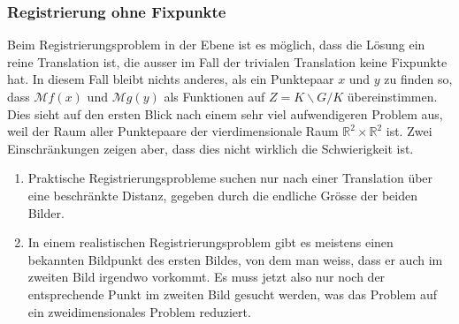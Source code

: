 %
%
\subsubsection{Registrierung ohne Fixpunkte}
Beim Registrierungsproblem in der Ebene ist es möglich, dass die
Lösung ein reine Translation ist, die ausser im Fall der trivialen
Translation keine Fixpunkte hat.
In diesem Fall bleibt nichts anderes, als ein Punktepaar $x$ und $y$
zu finden so, dass $\mathcal{M}f(x)$ und $\mathcal{M}g(y)$ als Funktionen
auf $Z=K\backslash G/K$ übereinstimmen.
Dies sieht auf den ersten Blick nach einem sehr viel aufwendigeren
Problem aus, weil der Raum aller Punktepaare der vierdimensionale
Raum $\mathbb{R}^2\times\mathbb{R}^2$ ist.
Zwei Einschränkungen zeigen aber, dass dies nicht wirklich die
Schwierigkeit ist.
\begin{enumerate}
\item
Praktische Registrierungsprobleme suchen nur nach einer Translation
über eine beschränkte Distanz, gegeben durch die endliche Grösse 
der beiden Bilder.
\item
In einem realistischen Registrierungsproblem gibt es meistens einen
bekannten Bildpunkt des ersten Bildes, von dem man weiss, dass er auch
im zweiten Bild irgendwo vorkommt.
Es muss jetzt also nur noch der entsprechende Punkt im zweiten Bild
gesucht werden, was das Problem auf ein zweidimensionales Problem
reduziert.
\end{enumerate}



